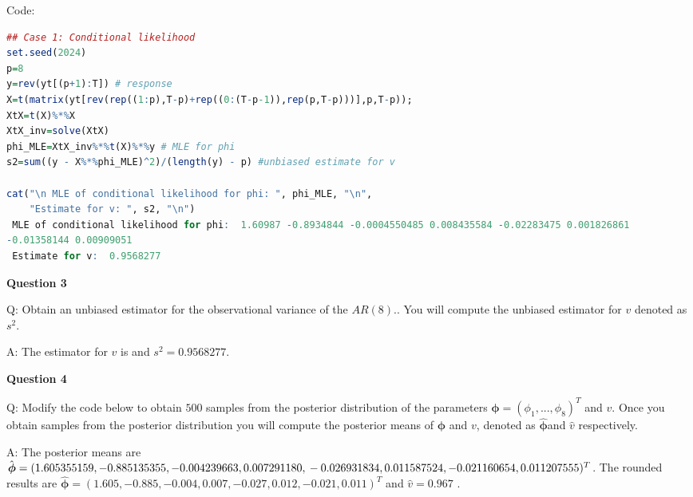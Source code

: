 \documentclass[8p, a4paper] {article}
\begin{document}
\newpage
\noindent
Code:


\tiny
\begin{lstlisting}[language=R]
## Case 1: Conditional likelihood
set.seed(2024)
p=8
y=rev(yt[(p+1):T]) # response
X=t(matrix(yt[rev(rep((1:p),T-p)+rep((0:(T-p-1)),rep(p,T-p)))],p,T-p));
XtX=t(X)%*%X
XtX_inv=solve(XtX)
phi_MLE=XtX_inv%*%t(X)%*%y # MLE for phi
s2=sum((y - X%*%phi_MLE)^2)/(length(y) - p) #unbiased estimate for v

cat("\n MLE of conditional likelihood for phi: ", phi_MLE, "\n",
    "Estimate for v: ", s2, "\n")
 MLE of conditional likelihood for phi:  1.60987 -0.8934844 -0.0004550485 0.008435584 -0.02283475 0.001826861 
-0.01358144 0.00909051 
 Estimate for v:  0.9568277 
\end{lstlisting}

\normalsize

\noindent
\begin{center}
\textbf{\huge Question 3}
\end{center}


\vspace{15}
\noindent
Q: Obtain an unbiased estimator for the observational variance of the $AR(8)$.. You will compute the unbiased estimator for $v$ denoted as $s^{2}$.

\vspace{15}
\noindent
A: The estimator for $v$ is and $s^{2} = 0.9568277$.


\normalsize

\noindent
\begin{center}
\textbf{\huge Question 4}
\end{center}


\vspace{15}
\noindent
Q: Modify the code below to obtain $500$ samples from the posterior distribution of the parameters  $\boldsymbol{\phi} = ( \phi_{1},... , \phi_{8})^{T}$ and $v$. Once you obtain samples from the posterior distribution you will compute the posterior means of $\boldsymbol{\phi}$ and $v$, denoted as $\hat{\boldsymbol{\phi}}$​ and $\hat{v}$ respectively.

\vspace{15}
\noindent
A: The posterior means are $\hat{\boldsymbol{\phi}} = ( 1.605355159, -0.885135355, -0.004239663,  0.007291180, \\
 -0.026931834,  0.011587524, -0.021160654,  0.011207555)^{T}$. The rounded results are $\hat{\boldsymbol{\phi}} = (1.605, -0.885, -0.004,  0.007, -0.027,  0.012, -0.021,  0.011)^{T}$ and $\hat{v} = 0.967$ .
\end{document}
